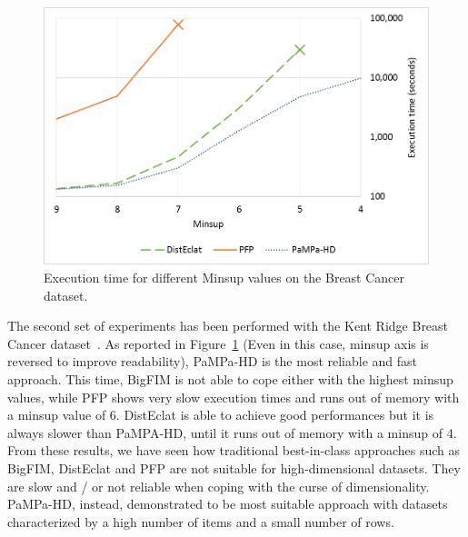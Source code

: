 \begin{figure}[!t]
\includegraphics[width=5in]{immagini_extension/breast_confronto.png}
\caption{Execution time for different Minsup values on the Breast Cancer dataset.}
\label{breast_confronto}
\end{figure}
The second set of experiments has been performed with the Kent Ridge Breast
Cancer dataset~\cite{breast_cancer_dataset}.
As reported in Figure~\ref{breast_confronto} (Even in this case, minsup axis is reversed to improve readability), PaMPa-HD is the most reliable and fast approach.
This time, BigFIM is not able to cope either with the highest minsup values, while PFP shows very slow execution times and runs out of memory with a minsup value of 6.
DistEclat is able to achieve good performances but it is always slower than PaMPA-HD, until it runs out of memory with a minsup of 4.
From these results, we have seen how  traditional best-in-class approaches such as BigFIM, DistEclat and PFP are not suitable for high-dimensional datasets. They are slow and / or not reliable when coping with the curse of dimensionality. PaMPa-HD, instead, demonstrated to be most suitable approach with datasets characterized by a high number of items and a small number of rows.

